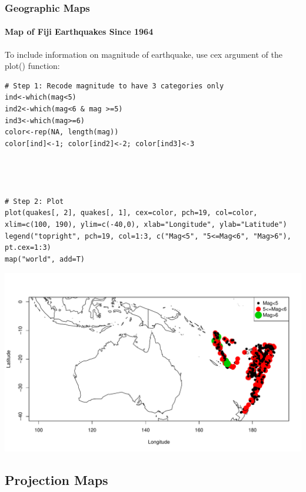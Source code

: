 \begin{frame}
\frametitle{Geographic Maps}
  \framesubtitle{Map of Fiji Earthquakes Since 1964}

To include information on magnitude of earthquake, use \ttfamily cex \normalfont argument of the \ttfamily plot() \normalfont function:
\begin{lstlisting}
# Step 1: Recode magnitude to have 3 categories only
ind<-which(mag<5)
ind2<-which(mag<6 & mag >=5)
ind3<-which(mag>=6)
color<-rep(NA, length(mag))
color[ind]<-1; color[ind2]<-2; color[ind3]<-3




# Step 2: Plot
plot(quakes[, 2], quakes[, 1], cex=color, pch=19, col=color, xlim=c(100, 190), ylim=c(-40,0), xlab="Longitude", ylab="Latitude")
legend("topright", pch=19, col=1:3, c("Mag<5", "5<=Mag<6", "Mag>6"), pt.cex=1:3)
map("world", add=T)
\end{lstlisting}

\newpage
       \begin{center}
		\includegraphics[scale=0.42]{images/fujiColor.pdf}
	\end{center}

\end{frame}


\subsection{Projection Maps}

